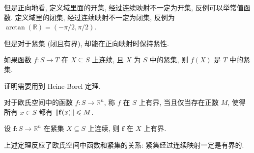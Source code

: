 \documentclass[UTF8]{ctexart}
\theoremstyle{mystyle}
\newcommand{\ve}[1]{\boldsymbol{\mathbf{#1}}}
\newcommand{\R}{\mathbb R}
\DeclarePairedDelimiter\norm{\lVert}{\rVert}
\begin{document}
但是正向地看, 定义域里面的开集, 经过连续映射不一定为开集, 反例可以举常值函数. 定义域里的闭集, 经过连续映射不一定为闭集, 反例为 $ \arctan(\R) = (-\pi/2, \pi/2) $.

但是对于紧集 (闭且有界), 却能在正向映射时保持紧性.

\begin{proposition}
    如果函数 $ f \colon S \to T $ 在 $ X \subseteq S $ 上连续, 且 $ X $ 为 $ S $ 中的紧集, 则 $ f(X) $ 是 $ T $ 中的紧集.
\end{proposition}

证明需要用到 Heine-Borel 定理.

\begin{definition}
    对于欧氏空间中的函数 $ f \colon S \to \R^n $, 称 $ f $ 在 $ S $ 上有界, 当且仅当存在正数 $ M $, 使得所有 $ x \in S $ 都有 $ \norm{\ve f(x)} \leqslant M $.
\end{definition}

\begin{theorem}
    设 $ \ve f \colon S \to \R^n $ 在紧集 $ X \subseteq S $ 上连续, 则 $ \ve f $ 在 $ X $ 上有界.
\end{theorem}

上述定理反应了欧氏空间中函数和紧集的关系: 紧集经过连续映射一定是有界的.
\end{document}
